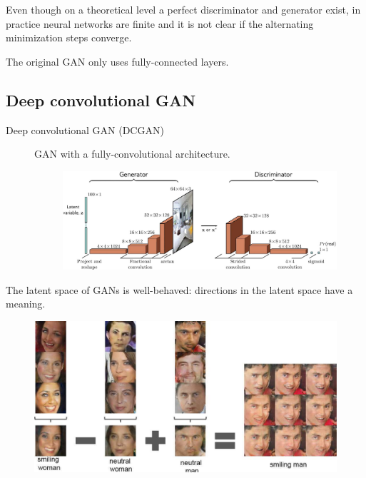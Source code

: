 \begin{description}
        \begin{remark}
            Even though on a theoretical level a perfect discriminator and generator exist, in practice neural networks are finite and it is not clear if the alternating minimization steps converge.
        \end{remark}

        \begin{remark}
            The original GAN only uses fully-connected layers.
        \end{remark}
\end{description}


\subsection{Deep convolutional GAN}

\begin{description}
    \item[Deep convolutional GAN (DCGAN)] 
        GAN with a fully-convolutional architecture.

        \begin{figure}[H]
            \centering
            \includegraphics[width=0.6\linewidth]{./img/dcgan.jpg}
        \end{figure}
\end{description}

\begin{remark}
    The latent space of GANs is well-behaved: directions in the latent space have a meaning.

    \begin{figure}[H]
        \centering
        \includegraphics[width=0.5\linewidth]{./img/gan_latent_interpolation.jpg}
    \end{figure}
\end{remark}


